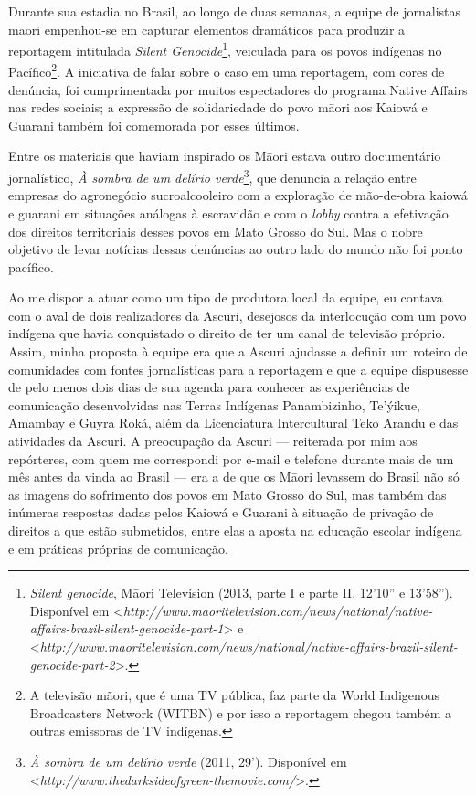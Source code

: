Durante sua estadia no Brasil, ao longo de duas semanas, a equipe de
jornalistas māori empenhou-se em capturar elementos dramáticos para
produzir a reportagem intitulada \emph{Silent Genocide}\footnote{\emph{Silent
  genocide}, Māori Television (2013, parte I e parte II, 12'10'' e
  13'58''). Disponível em
  \textless{}\emph{http://www.maoritelevision.com/news/national/native-affairs-brazil-silent-genocide-part-1}\textgreater{}
  e
  \textless{}\emph{http://www.maoritelevision.com/news/national/native-affairs-brazil-silent-genocide-part-2}\textgreater{}.},
veiculada para os povos indígenas no Pacífico\footnote{A televisão
  mãori, que é uma TV pública, faz parte da World Indigenous
  Broadcasters Network (WITBN) e por isso a reportagem chegou também a
  outras emissoras de TV indígenas.}. A iniciativa de falar sobre o caso
em uma reportagem, com cores de denúncia, foi cumprimentada por muitos
espectadores do programa Native Affairs nas redes sociais; a expressão
de solidariedade do povo māori aos Kaiowá e Guarani também foi
comemorada por esses últimos.

Entre os materiais que haviam inspirado os Māori estava outro
documentário jornalístico, \emph{À sombra de um delírio verde}\footnote{\emph{À
  sombra de um delírio verde} (2011, 29'). Disponível em
  \textless{}\emph{http://www.thedarksideofgreen-themovie.com/}\textgreater{}.},
que denuncia a relação entre empresas do agronegócio sucroalcooleiro com
a exploração de mão-de-obra kaiowá e guarani em situações análogas à
escravidão e com o \emph{lobby} contra a efetivação dos direitos
territoriais desses povos em Mato Grosso do Sul. Mas o nobre objetivo de
levar notícias dessas denúncias ao outro lado do mundo não foi ponto
pacífico.

Ao me dispor a atuar como um tipo de produtora local da equipe, eu
contava com o aval de dois realizadores da Ascuri, desejosos da
interlocução com um povo indígena que havia conquistado o direito de ter
um canal de televisão próprio. Assim, minha proposta à equipe era que a
Ascuri ajudasse a definir um roteiro de comunidades com fontes
jornalísticas para a reportagem e que a equipe dispusesse de pelo menos
dois dias de sua agenda para conhecer as experiências de comunicação
desenvolvidas nas Terras Indígenas Panambizinho, Te'ýikue, Amambay e
Guyra Roká, além da Licenciatura Intercultural Teko Arandu e das
atividades da Ascuri. A preocupação da Ascuri --- reiterada por mim aos
repórteres, com quem me correspondi por e-mail e telefone durante mais
de um mês antes da vinda ao Brasil --- era a de que os Māori levassem do
Brasil não só as imagens do sofrimento dos povos em Mato Grosso do Sul,
mas também das inúmeras respostas dadas pelos Kaiowá e Guarani à
situação de privação de direitos a que estão submetidos, entre elas a
aposta na educação escolar indígena e em práticas próprias de
comunicação.

